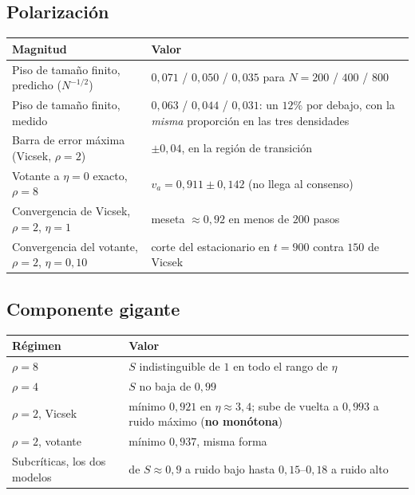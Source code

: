 \documentclass[11pt]{article}
\begin{document}

\subsection{Polarización}

\begin{center}
\begin{tabular}{p{5.2cm}p{8.6cm}}
  \toprule
  Magnitud & Valor \\
  \midrule
  Piso de tamaño finito, predicho ($N^{-1/2}$) & $0{,}071$ / $0{,}050$ / $0{,}035$ para $N = 200$ / $400$ / $800$ \\
  Piso de tamaño finito, medido & $0{,}063$ / $0{,}044$ / $0{,}031$: un $12\%$ por debajo, con la \emph{misma} proporción en las tres densidades \\
  Barra de error máxima (Vicsek, $\rho = 2$) & $\pm 0{,}04$, en la región de transición \\
  Votante a $\eta = 0$ exacto, $\rho = 8$ & $v_a = 0{,}911 \pm 0{,}142$ (no llega al consenso) \\
  Convergencia de Vicsek, $\rho = 2$, $\eta = 1$ & meseta $\approx 0{,}92$ en menos de $200$ pasos \\
  Convergencia del votante, $\rho = 2$, $\eta = 0{,}10$ & corte del estacionario en $t = 900$ contra $150$ de Vicsek \\
  \bottomrule
\end{tabular}
\end{center}


\subsection{Componente gigante}

\begin{center}
\begin{tabular}{p{5.2cm}p{8.6cm}}
  \toprule
  Régimen & Valor \\
  \midrule
  $\rho = 8$ & $S$ indistinguible de $1$ en todo el rango de $\eta$ \\
  $\rho = 4$ & $S$ no baja de $0{,}99$ \\
  $\rho = 2$, Vicsek & mínimo $0{,}921$ en $\eta \approx 3{,}4$; sube de vuelta a $0{,}993$ a ruido máximo (\textbf{no monótona}) \\
  $\rho = 2$, votante & mínimo $0{,}937$, misma forma \\
  Subcríticas, los dos modelos & de $S \approx 0{,}9$ a ruido bajo hasta $0{,}15$--$0{,}18$ a ruido alto \\
  \bottomrule
\end{tabular}
\end{center}
\end{document}
